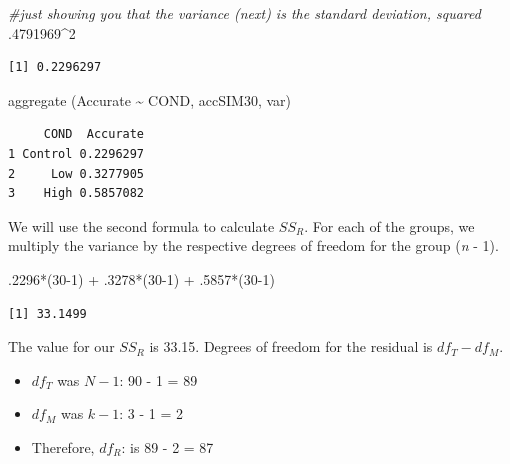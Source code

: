 \documentclass[
  english,
]{book}
\newenvironment{Shaded}{\begin{snugshade}}{\end{snugshade}}
\newcommand{\CommentTok}[1]{\textcolor[rgb]{0.56,0.35,0.01}{\textit{#1}}}
\newcommand{\DecValTok}[1]{\textcolor[rgb]{0.00,0.00,0.81}{#1}}
\newcommand{\FunctionTok}[1]{\textcolor[rgb]{0.00,0.00,0.00}{#1}}
\newcommand{\NormalTok}[1]{#1}
\newcommand{\SpecialCharTok}[1]{\textcolor[rgb]{0.00,0.00,0.00}{#1}}
\providecommand{\tightlist}{%
  \setlength{\itemsep}{0pt}\setlength{\parskip}{0pt}}
\begin{document}
\begin{Shaded}
\begin{Highlighting}[]
\CommentTok{\#just showing you that the variance (next) is the standard deviation, squared}
\NormalTok{.}\DecValTok{4791969}\SpecialCharTok{\^{}}\DecValTok{2}
\end{Highlighting}
\end{Shaded}

\begin{verbatim}
[1] 0.2296297
\end{verbatim}

\begin{Shaded}
\begin{Highlighting}[]
\FunctionTok{aggregate}\NormalTok{ (Accurate }\SpecialCharTok{\textasciitilde{}}\NormalTok{ COND, accSIM30, var)}
\end{Highlighting}
\end{Shaded}

\begin{verbatim}
     COND  Accurate
1 Control 0.2296297
2     Low 0.3277905
3    High 0.5857082
\end{verbatim}

We will use the second formula to calculate \(SS_R\). For each of the groups, we multiply the variance by the respective degrees of freedom for the group (\emph{n} - 1).

\begin{Shaded}
\begin{Highlighting}[]
\NormalTok{.}\DecValTok{2296}\SpecialCharTok{*}\NormalTok{(}\DecValTok{30{-}1}\NormalTok{) }\SpecialCharTok{+}\NormalTok{ .}\DecValTok{3278}\SpecialCharTok{*}\NormalTok{(}\DecValTok{30{-}1}\NormalTok{) }\SpecialCharTok{+}\NormalTok{ .}\DecValTok{5857}\SpecialCharTok{*}\NormalTok{(}\DecValTok{30{-}1}\NormalTok{)}
\end{Highlighting}
\end{Shaded}

\begin{verbatim}
[1] 33.1499
\end{verbatim}

The value for our \(SS_R\) is 33.15. Degrees of freedom for the residual is \(df_T - df_M\).

\begin{itemize}
\tightlist
\item
  \(df_T\) was \(N-1\): 90 - 1 = 89
\item
  \(df_M\) was \(k - 1\): 3 - 1 = 2
\item
  Therefore, \(df_R\): is 89 - 2 = 87
\end{itemize}
\end{document}
